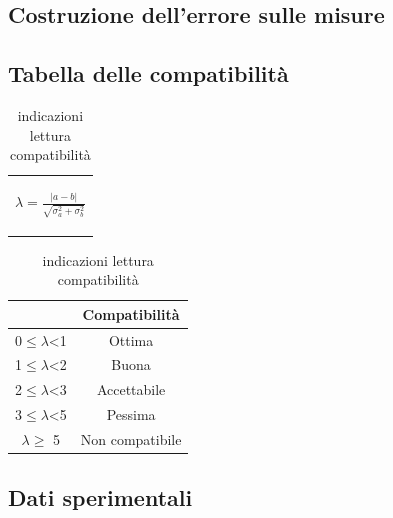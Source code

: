 \documentclass{article}
\begin{document}
	\subsection{Costruzione dell'errore sulle misure}
	\label{Calcerr}

	\subsection{Tabella delle compatibilità}
	\medskip
	\begin{table}[H]
		\centering
		\begin{tabular}{c}
			\begin{Large}
			$\lambda=\frac{|a-b|}{\sqrt{\sigma_a^2+\sigma_b^2}}$
			\end{Large}\\
		\end{tabular}
		\hspace{0.5cm}
		\begin{tabular}{cc}
			\toprule
			&       \textbf{Compatibilità   }       \\
			\midrule
			0$\leq \lambda$<1   &Ottima                 \\
			1$\leq \lambda$<2   &Buona                  \\
			2$\leq \lambda$<3   &Accettabile            \\
			3$\leq\lambda$<5   &Pessima                \\
			$ \lambda \geq $  5     &Non compatibile        \\
			\bottomrule
		\end{tabular}
		\caption{indicazioni lettura compatibilità}
		\label{tab:compatibilità}
	\end{table}

	\subsection{Dati sperimentali}


   
\end{document}
